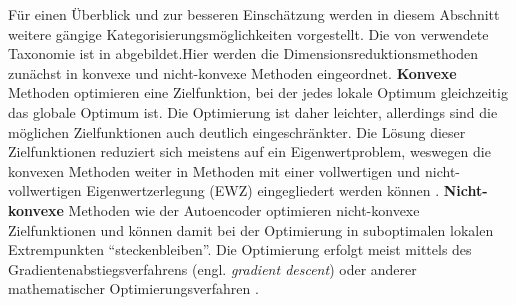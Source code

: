 Für einen Überblick und zur besseren Einschätzung werden in diesem Abschnitt weitere gängige
Kategorisierungsmöglichkeiten vorgestellt. Die von \textcite{vanderMaaten.2009} verwendete
Taxonomie ist in 
abgebildet.Hier werden die
Dimensionsreduktionsmethoden zunächst in konvexe und nicht-konvexe Methoden eingeordnet.
\textbf{Konvexe} Methoden optimieren eine Zielfunktion, bei der jedes lokale Optimum gleichzeitig
das globale Optimum ist. Die Optimierung ist daher leichter, allerdings sind die möglichen
Zielfunktionen auch deutlich eingeschränkter. Die Lösung dieser Zielfunktionen reduziert sich
meistens auf ein Eigenwertproblem, weswegen die konvexen Methoden weiter in Methoden mit einer
vollwertigen und nicht-vollwertigen Eigenwertzerlegung (EWZ) eingegliedert werden können \parencite[3]{vanderMaaten.2009}. \textbf{Nicht-konvexe} Methoden wie der Autoencoder optimieren
nicht-konvexe Zielfunktionen und können damit bei der Optimierung in suboptimalen lokalen
Extrempunkten \enquote{steckenbleiben}. Die Optimierung erfolgt meist mittels des
Gradientenabstiegsverfahrens (engl. \textit{gradient descent}) oder anderer mathematischer
Optimierungsverfahren \parencite[siehe z.B.][]{Guler.2010}.


